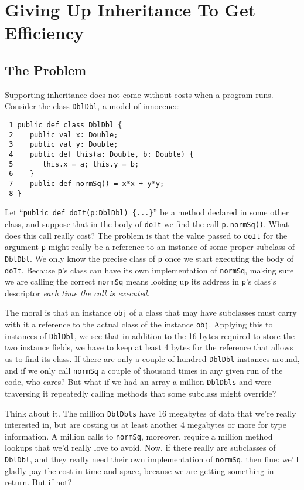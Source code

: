 \section{Giving Up Inheritance To Get Efficiency}\label{sec:guitge}
\subsection{The Problem}

Supporting inheritance does not come without costs when a program runs.
Consider the class {\tt DblDbl}, a model of innocence:
\begin{verbatim}
 1 public def class DblDbl {
 2    public val x: Double;
 3    public val y: Double;
 4    public def this(a: Double, b: Double) {
 5       this.x = a; this.y = b;
 6    }
 7    public def normSq() = x*x + y*y;
 8 }
\end{verbatim} 
Let ``{\tt public def doIt(p:DblDbl) \{...\}}'' be a method declared in some
other class, and suppose that in the body of {\tt doIt}
we find the call {\tt p.normSq()}.  What does this call really cost?
The problem is that the value passed to {\tt doIt} for the argument {\tt p}
might really be a reference to an instance of some proper subclass
of {\tt DblDbl}. We only know the precise class of {\tt p} once we start
executing the body of {\tt doIt}.  Because {\tt p}'s class can have its own
implementation of {\tt normSq}, making sure we are calling the correct
{\tt normSq} means looking up its address in {\tt p}'s class's 
descriptor {\em each time the call is executed}.

The moral is that an instance {\tt obj} of a class that may have subclasses
must carry with it a reference to the actual class of the instance {\tt obj}.
Applying this to instances of {\tt DblDbl}, we see that in addition to
the 16 bytes required to store the two instance fields, we have to keep
at least 4 bytes for the reference that allows us to find its class.
If there are only a couple of hundred {\tt DblDbl} instances around, and
if we only call {\tt normSq} a couple of thousand times in any
given run of the code, who cares?  But what if we had an array a million
{\tt DblDbls} and were traversing it repeatedly calling methods that
some subclass might override?

Think about it.  The million {\tt DblDbls} have
16 megabytes of data that we're really interested in, but are costing us
at least another 4 megabytes or more for type information.  A million
calls to {\tt normSq}, moreover, require a million method lookups that
we'd really love to avoid.  Now, if
there really are subclasses of {\tt DblDbl}, and they really need their own
implementation of {\tt normSq}, then fine: we'll gladly pay the cost in time
and space, because we are getting something in return. But if not? 

